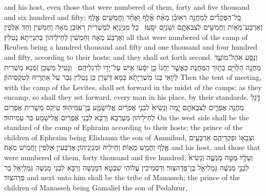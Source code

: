 {and his host, even those that were numbered of them, forty and five thousand and six hundred and fifty;}{}
{כׇּֽל־הַפְּקֻדִ֞ים לְמַחֲנֵ֣ה רְאוּבֵ֗ן מְאַ֨ת אֶ֜לֶף וְאֶחָ֨ד וַחֲמִשִּׁ֥ים אֶ֛לֶף וְאַרְבַּע־מֵא֥וֹת וַחֲמִשִּׁ֖ים לְצִבְאֹתָ֑ם וּשְׁנִיִּ֖ם יִסָּֽעוּ׃ \setuma }
{כָּל מִנְיָנַיָּא לְמַשְׁרִית רְאוּבֵן מְאָה וְחַמְשִׁין וְחַד אַלְפִין וְאַרְבַּע מְאָה וְחַמְשִׁין לְחֵילֵיהוֹן בְּתִנְיֵיתָא נָטְלִין׃}
{all that were numbered of the camp of Reuben being a hundred thousand and fifty and one thousand and four hundred and fifty, according to their hosts; and they shall set forth second.}{}
{וְנָסַ֧ע אֹֽהֶל־מוֹעֵ֛ד מַחֲנֵ֥ה הַלְוִיִּ֖ם בְּת֣וֹךְ הַֽמַּחֲנֹ֑ת כַּאֲשֶׁ֤ר יַחֲנוּ֙ כֵּ֣ן יִסָּ֔עוּ אִ֥ישׁ עַל־יָד֖וֹ לְדִגְלֵיהֶֽם׃ \setuma 
{}}
{וְנָטֵיל מַשְׁכַּן זִמְנָא מַשְׁרִית לֵיוָאֵי בְּגוֹ מַשְׁרְיָתָא כְּמָא דְּשָׁרַן כֵּן נָטְלִין גְּבַר עַל אַתְרֵיהּ לְטִקְסֵיהוֹן׃}
{Then the tent of meeting, with the camp of the Levites, shall set forward in the midst of the camps; as they encamp, so shall they set forward, every man in his place, by their standards.}{}
{דֶּ֣גֶל מַחֲנֵ֥ה אֶפְרַ֛יִם לְצִבְאֹתָ֖ם יָ֑מָּה וְנָשִׂיא֙ לִבְנֵ֣י אֶפְרַ֔יִם אֱלִישָׁמָ֖ע בֶּן־עַמִּיהֽוּד׃}
{טֵיקַס מַשְׁרִית אֶפְרַיִם לְחֵילֵיהוֹן מַעְרְבָא וְרַבָּא לִבְנֵי אֶפְרַיִם אֱלִישָׁמָע בַּר עַמִּיהוּד׃}
{On the west side shall be the standard of the camp of Ephraim according to their hosts; the prince of the children of Ephraim being Elishama the son of Ammihud,}{}
{וּצְבָא֖וֹ וּפְקֻדֵיהֶ֑ם אַרְבָּעִ֥ים אֶ֖לֶף וַחֲמֵ֥שׁ מֵאֽוֹת׃}
{וְחֵילֵיהּ וּמִנְיָנֵיהוֹן אַרְבְּעִין אַלְפִין וַחֲמֵישׁ מְאָה׃}
{and his host, and those that were numbered of them, forty thousand and five hundred;}{}
{וְעָלָ֖יו מַטֵּ֣ה מְנַשֶּׁ֑ה וְנָשִׂיא֙ לִבְנֵ֣י מְנַשֶּׁ֔ה גַּמְלִיאֵ֖ל בֶּן־פְּדָהצֽוּר׃
}
{וְדִסְמִיכִין עֲלוֹהִי שִׁבְטָא דִּמְנַשֶּׁה וְרַבָּא לִבְנֵי מְנַשֶּׁה גַּמְלִיאֵל בַּר פְּדָהצוּר׃}
{and next unto him shall be the tribe of Manasseh; the prince of the children of Manasseh being Gamaliel the son of Pedahzur,}{}
